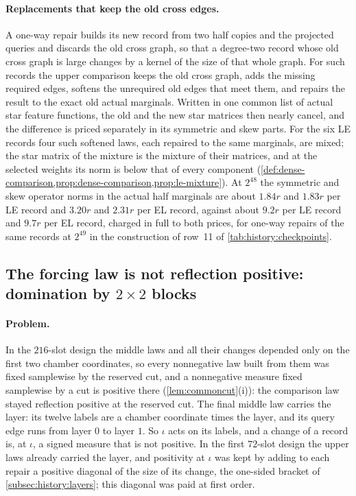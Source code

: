 \paragraph{Replacements that keep the old cross edges.}
A one-way repair builds its new record from two half copies and the projected
queries and discards the old cross graph, so that a degree-two record whose old
cross graph is large changes by a kernel of the size of that whole graph. For
such records the upper comparison keeps the old cross graph, adds the missing
required edges, softens the unrequired old edges that meet them, and repairs
the result to the exact old actual marginals. Written in one
common list of actual star feature functions, the old and the new
star matrices then nearly cancel, and the
difference is priced separately in its symmetric and skew parts. For the six
LE records four such softened laws, each repaired to the same marginals, are
mixed; the star matrix of the mixture is the mixture of their matrices, and at
the selected weights its norm is below that of every component
(\cref{def:dense-comparison,prop:dense-comparison,prop:le-mixture}). At $2^{48}$
the symmetric and skew operator norms in the actual half
marginals are about $1.84r$ and $1.83r$ per LE record and $3.20r$
and $2.31r$ per EL record, against about $9.2r$ per LE record and
$9.7r$ per EL record, charged in full to both prices, for one-way repairs of the
same records at $2^{49}$ in the construction of row~11 of
\cref{tab:history:checkpoints}.


\subsection{The forcing law is not reflection positive: domination by \texorpdfstring{$2\times2$}{2 x 2} blocks}
\label{subsec:walk:bracket}

\paragraph{Problem.}
In the $216$-slot design the middle laws and all their changes depended only
on the first two chamber coordinates, so every nonnegative law built from them
was fixed samplewise by the reserved cut, and a nonnegative measure fixed
samplewise by a cut is positive there (\cref{lem:commoncut}(i)): the
comparison law stayed reflection positive at the reserved cut. The final
middle law carries the layer: its twelve labels are a
chamber coordinate times the layer, and its query edge runs from layer $0$ to
layer $1$. So $\iota$ acts on its labels, and a change of a record is, at
$\iota$, a signed measure that is not positive. In the first $72$-slot design
the upper laws already carried the layer, and positivity at $\iota$ was kept
by adding to each repair a positive diagonal of the size of its change, the
one-sided bracket of \cref{subsec:history:layers}; this diagonal was paid at
first order.

